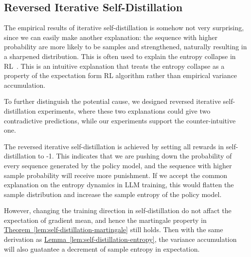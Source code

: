 
\subsection{Reversed Iterative Self-Distillation}

The empirical results of iterative self-distillation is somehow not very surprising, since we can easily make another explanation: the sequence with higher probability are more likely to be samples and strengthened, naturally resulting in a sharpened distribution. This is often used to explain the entropy collapse in RL~\citep{cui_entropy_2025, hao_rethinking_2026}. This is an intuitive explanation that treats the entropy collapse as a property of the expectation form RL algorithm rather than empirical variance accumulation.

To further distinguish the potential cause, we designed reversed iterative self-distillation experiments, where these two explanations could give two contradictive predictions, while our experiments support the counter-intuitive one.

The reversed iterative self-distillation is achieved by setting all rewards in self-distillation to -1. This indicates that we are pushing down the probability of every sequence generated by the policy model, and the sequence with higher sample probability will receive more punishment. If we accept the common explanation on the entropy dynamics in LLM training, this would flatten the sample distribution and increase the sample entropy of the policy model.

However, changing the training direction in self-distillation do not affact the expectation of gradient mean, and hence the martingale property in \hyperref[lem:self-distillation-martingale]{Theorem~\ref*{lem:self-distillation-martingale}} still holds. Then with the same derivation as \hyperref[lem:self-distillation-entropy]{Lemma~\ref*{lem:self-distillation-entropy}}, the variance accumulation will also guatantee a decrement of sample entropy in expectation.

